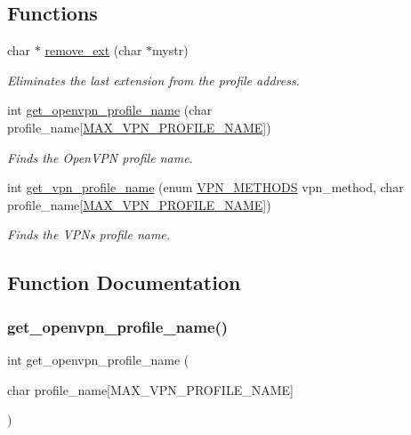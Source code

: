 \subsection*{Functions}
\begin{DoxyCompactItemize}
\item 
char $\ast$ \hyperlink{app-profile_8c_a59c7e3da3c5b7ecf10df2a5ef34b6953}{remove\+\_\+ext} (char $\ast$mystr)
\begin{DoxyCompactList}\small\item\em Eliminates the last extension from the profile address. \end{DoxyCompactList}\item 
int \hyperlink{app-profile_8c_a7ab4018359451259c67e57c83f9b7062}{get\+\_\+openvpn\+\_\+profile\+\_\+name} (char profile\+\_\+name\mbox{[}\hyperlink{route-tree_8h_ab6867a2365732ebd41ddf7459525d032}{M\+A\+X\+\_\+\+V\+P\+N\+\_\+\+P\+R\+O\+F\+I\+L\+E\+\_\+\+N\+A\+ME}\mbox{]})
\begin{DoxyCompactList}\small\item\em Finds the Open\+V\+PN profile name. \end{DoxyCompactList}\item 
int \hyperlink{app-profile_8c_aa32bea11cb1c8f99a45bc62cc8f5e455}{get\+\_\+vpn\+\_\+profile\+\_\+name} (enum \hyperlink{route-tree_8h_a5b876670828c4e38106ba1c6d91024b7}{V\+P\+N\+\_\+\+M\+E\+T\+H\+O\+DS} vpn\+\_\+method, char profile\+\_\+name\mbox{[}\hyperlink{route-tree_8h_ab6867a2365732ebd41ddf7459525d032}{M\+A\+X\+\_\+\+V\+P\+N\+\_\+\+P\+R\+O\+F\+I\+L\+E\+\_\+\+N\+A\+ME}\mbox{]})
\begin{DoxyCompactList}\small\item\em Finds the V\+PN\textquotesingle{}s profile name. \end{DoxyCompactList}\end{DoxyCompactItemize}


\subsection{Function Documentation}
\mbox{\label{app-profile_8c_a7ab4018359451259c67e57c83f9b7062}} 
\subsubsection{\texorpdfstring{get\+\_\+openvpn\+\_\+profile\+\_\+name()}{get\_openvpn\_profile\_name()}}
{\footnotesize\ttfamily int get\+\_\+openvpn\+\_\+profile\+\_\+name (\begin{DoxyParamCaption}\item[{char}]{profile\+\_\+name\mbox{[}\+M\+A\+X\+\_\+\+V\+P\+N\+\_\+\+P\+R\+O\+F\+I\+L\+E\+\_\+\+N\+A\+M\+E\mbox{]} }\end{DoxyParamCaption})}



